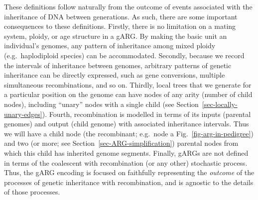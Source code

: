 \documentclass{article}
\newcommand{\noderef}[1]{\textsf{#1}}
\begin{document}
These definitions follow naturally from the outcome of events
associated with the inheritance of DNA between generations.
As such,
there are some important consequences to these definitions.
Firstly, there is
no limitation on a mating system, ploidy, or age structure in a gARG.
By making the
basic unit an individual's genomes,
any pattern of inheritance among mixed ploidy (e.g.\ haplodiploid
species) can be accommodated.
Secondly, because we record the intervals of inheritance
between genomes,
arbitrary patterns of genetic inheritance can be directly expressed, such as
gene conversions,
multiple simultaneous recombinations,
and so on.
Thirdly, local trees that we generate for a particular position on the
genome can have nodes of any arity (number of child nodes), including ``unary''
nodes with a single child (see Section~\ref{sec-locally-unary-edges}).
Fourth, recombination is modelled in terms of
its inputs (parental genomes) and output (child genome) with associated inheritance intervals.
Thus we will have a child node (the recombinant; e.g.\ node \noderef{a}
Fig.~\ref{fig-arg-in-pedigree}) and two (or more; see Section~\ref{sec-ARG-simplification})
parental nodes from which this child has inherited genome segments.
Finally, gARGs are not defined in terms of the
coalescent with recombination (or any other) stochastic process.
Thus, the gARG encoding is focused on faithfully representing the
\emph{outcome} of the processes of genetic inheritance
with recombination,
and is agnostic to the details of those processes.
\end{document}
